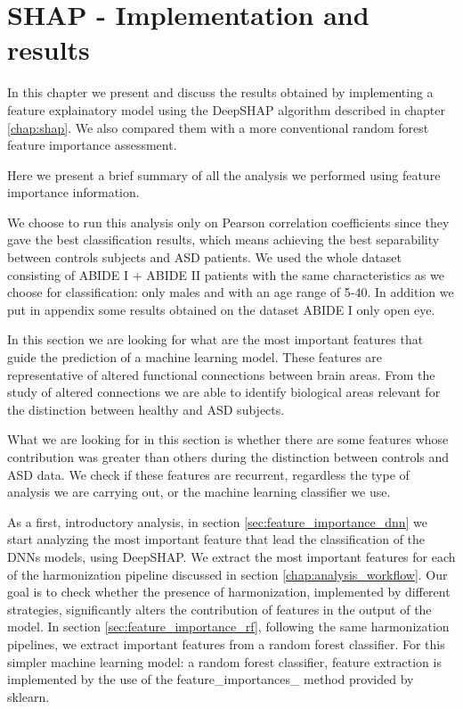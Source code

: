 \documentclass[11pt]{report}
\begin{document}
\newpage


\chapter{SHAP - Implementation and results}\label{chap:shap_results}

In this chapter we present and discuss the results obtained by implementing a feature explainatory model using the DeepSHAP algorithm described in chapter \ref{chap:shap}.
We also compared them with a more conventional random forest feature importance assessment.

Here we present a brief summary of all the analysis we performed using feature importance information.

We choose to run this analysis only on Pearson correlation coefficients since they gave the best classification results, which means achieving the best separability between controls subjects and ASD patients.
We used the whole dataset consisting of ABIDE I + ABIDE II patients with the same characteristics as we choose for classification: only males and with an age range of 5-40.
In addition we put in appendix some results obtained on the dataset ABIDE I only open eye.

 
In this section we are looking for what are the most important features that guide the prediction of a machine learning model.
These features are representative of altered functional connections between brain areas.
From the study of altered connections we are able to identify biological areas relevant for the distinction between healthy and ASD subjects.

What we are looking for in this section is whether there are some features whose contribution was greater than others during the distinction between controls and ASD data.
We check if these features are recurrent, regardless the type of analysis we are carrying out, or the machine learning classifier we use.

As a first, introductory analysis, in section \ref{sec:feature_importance_dnn} we start analyzing the most important feature that lead the classification of the DNNs models, using DeepSHAP.
We extract the most important features for each of the harmonization pipeline discussed in section \ref{chap:analysis_workflow}.
Our goal is to check whether the presence of harmonization, implemented by different strategies, significantly alters the contribution of features in the output of the model.
In section \ref{sec:feature_importance_rf}, following the same harmonization pipelines, we extract important features from a random forest classifier. 
For this simpler machine learning model: a random forest classifier, feature extraction is implemented by the use of the feature\_importances\_ method provided by sklearn.
\end{document}
